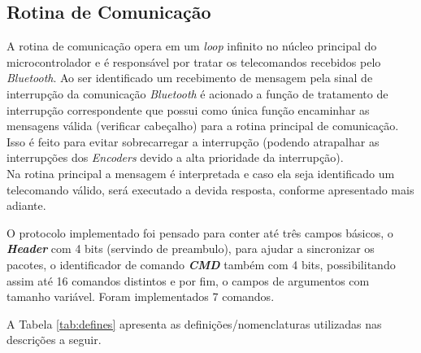 \subsection{Rotina de Comunicação}
\label{subsec:rotina_comunicacao}
A rotina de comunicação opera em um \emph{loop} infinito no núcleo principal do microcontrolador e é responsável por tratar os telecomandos recebidos pelo \textit{Bluetooth}. Ao ser identificado um recebimento de mensagem pela sinal de interrupção da comunicação \textit{Bluetooth} é acionado a função de tratamento de interrupção correspondente que possui como única função encaminhar as mensagens válida (verificar cabeçalho) para a rotina principal de comunicação. Isso é feito para evitar sobrecarregar a interrupção (podendo atrapalhar as interrupções dos \emph{Encoders} devido a alta prioridade da interrupção).\\

Na rotina principal a mensagem é interpretada e caso ela seja identificado um telecomando válido, será executado a devida resposta, conforme apresentado mais adiante.

O protocolo implementado foi pensado para conter até três campos básicos, o \textbf{\textit{Header}} com 4 bits (servindo de preambulo), para ajudar a sincronizar os pacotes, o identificador de comando \textbf{\textit{CMD}} também com 4 bits, possibilitando assim até 16 comandos distintos e por fim, o campos de argumentos com tamanho variável. Foram implementados 7 comandos.



A Tabela \ref{tab:defines} apresenta as definições/nomenclaturas utilizadas nas descrições a seguir.

